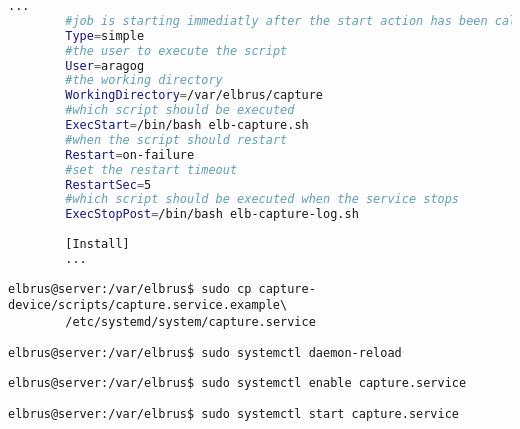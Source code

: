 	\lstset{style=files}
	\begin{lstlisting}[caption={capture.service.example - Die Variable 'WorkingDirectory', Die Variable 'User' sowie die Variable 'ExecStopPost' anpassen.},language=bash ,keywords={WorkingDirectory, User, ExecStopPost}, keywordstyle=\color{red}, firstnumber=3]
		...
		#job is starting immediatly after the start action has been called
		Type=simple
		#the user to execute the script
		User=aragog
		#the working directory
		WorkingDirectory=/var/elbrus/capture
		#which script should be executed
		ExecStart=/bin/bash elb-capture.sh
		#when the script should restart
		Restart=on-failure
		#set the restart timeout
		RestartSec=5
		#which script should be executed when the service stops
		ExecStopPost=/bin/bash elb-capture-log.sh
		
		[Install]
		...
	\end{lstlisting}
	
	\lstset{style=commands}
	\begin{lstlisting}[caption={Kopieren des Serviceprogrammes.}]
		elbrus@server:/var/elbrus$ sudo cp capture-device/scripts/capture.service.example\
		/etc/systemd/system/capture.service
	\end{lstlisting}
	
	\lstset{style=commands}
	\begin{lstlisting}[caption={Neuladen des 'systemctl' Deamons.}]
		elbrus@server:/var/elbrus$ sudo systemctl daemon-reload
	\end{lstlisting}
	
	\lstset{style=commands}
	\begin{lstlisting}[caption={Aktivieren des Serviceprogrammes.}]
		elbrus@server:/var/elbrus$ sudo systemctl enable capture.service
	\end{lstlisting}
	
	\lstset{style=commands}
	\begin{lstlisting}[caption={Starten des Serviceprogrammes.}]
		elbrus@server:/var/elbrus$ sudo systemctl start capture.service
	\end{lstlisting}